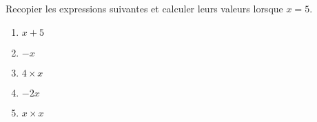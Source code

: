 
\begin{exercice}\label{exosmath-0966}

    Recopier les expressions suivantes et calculer leurs valeurs lorsque \( x=5\).
    \begin{multicols}{2}
        \begin{enumerate}
            \item
                \( x+5\)
            \item
                \( -x\)
            \item
                \( 4\times x\)
            \item
                \( -2x\)
            \item
                \( x\times x\)
        \end{enumerate}
    \end{multicols}

\end{exercice}
